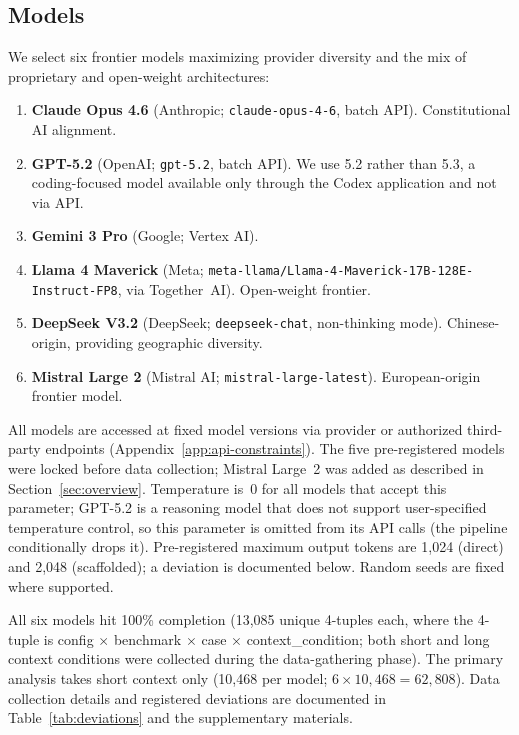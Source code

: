\documentclass[preprint]{article}
\begin{document}
\subsection{Models}

We select six frontier models maximizing provider diversity and the mix of proprietary and open-weight architectures:

\begin{enumerate}[leftmargin=*]
    \item \textbf{Claude Opus 4.6} (Anthropic; \texttt{claude-opus-4-6}, batch API). Constitutional AI alignment.
    \item \textbf{GPT-5.2} (OpenAI; \texttt{gpt-5.2}, batch API). We use 5.2 rather than 5.3, a coding-focused model available only through the Codex application and not via API.
    \item \textbf{Gemini 3 Pro} (Google; Vertex AI).
    \item \textbf{Llama 4 Maverick} (Meta; {\small\texttt{meta-llama/Llama-4-Maverick-17B-128E-Instruct-FP8}}, via Together~AI). Open-weight frontier.
    \item \textbf{DeepSeek V3.2} (DeepSeek; \texttt{deepseek-chat}, non-thinking mode). Chinese-origin, providing geographic diversity.
    \item \textbf{Mistral Large 2} (Mistral AI; \texttt{mistral-large-latest}). European-origin frontier model.
\end{enumerate}

All models are accessed at fixed model versions via provider or authorized third-party endpoints (Appendix~\ref{app:api-constraints}). The five pre-registered models were locked before data collection; Mistral Large~2 was added as described in Section~\ref{sec:overview}. Temperature is~0 for all models that accept this parameter; GPT-5.2 is a reasoning model that does not support user-specified temperature control, so this parameter is omitted from its API calls (the pipeline conditionally drops it). Pre-registered maximum output tokens are 1,024 (direct) and 2,048 (scaffolded); a deviation is documented below. Random seeds are fixed where supported.

All six models hit 100\% completion (13,085 unique 4-tuples each, where the 4-tuple is config $\times$ benchmark $\times$ case $\times$ context\_condition; both short and long context conditions were collected during the data-gathering phase).  The primary analysis takes short context only (10,468 per model; $6 \times 10{,}468 = 62{,}808$).  Data collection details and registered deviations are documented in Table~\ref{tab:deviations} and the supplementary materials.
\end{document}
